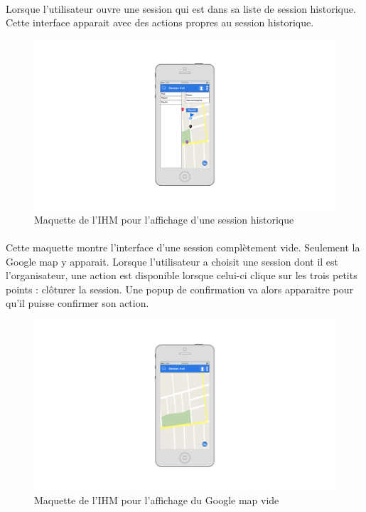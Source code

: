\documentclass[titlepage, 12pt]{report}
\begin{document}
\paragraph{}Lorsque l'utilisateur ouvre une session qui est dans sa liste de session historique. Cette interface apparait avec des actions propres au session historique.

\begin{figure}[!h]
	\caption{Maquette de l'IHM pour l'affichage d'une session historique}
	\label{history_session}
	\centering
	\includegraphics[scale=0.2]{images/mockups/history_session.png}
\end{figure}

\paragraph{}Cette maquette montre l'interface d'une session complètement vide. Seulement la Google map y apparait. Lorsque l'utilisateur a choisit une session dont il est l'organisateur, une action est disponible lorsque celui-ci clique sur les trois petits points : clôturer la session. Une popup de confirmation va alors apparaitre pour qu'il puisse confirmer son action.

\begin{figure}[!h]
	\caption{Maquette de l'IHM pour l'affichage du Google map vide}
	\label{google_map_view}
	\centering
	\includegraphics[scale=0.2]{images/mockups/google_map_view.png}
\end{figure}
\end{document}
